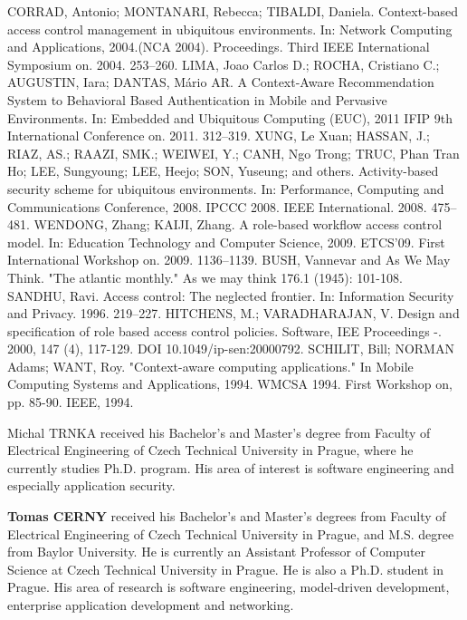 \documentclass{poster15}
\begin{document}
\begin{thebibliography}{9}
CORRAD, Antonio; MONTANARI, Rebecca; TIBALDI, Daniela. Context-based access control management in ubiquitous environments. In: Network Computing and Applications, 2004.(NCA 2004). Proceedings. Third IEEE International Symposium on. 2004. 253–260.
LIMA, Joao Carlos D.; ROCHA, Cristiano C.; AUGUSTIN, Iara; DANTAS, Mário AR. A Context-Aware Recommendation System to Behavioral Based Authentication in Mobile and Pervasive Environments. In: Embedded and Ubiquitous Computing (EUC), 2011 IFIP 9th International Conference on. 2011. 312–319.
XUNG, Le Xuan; HASSAN, J.; RIAZ, AS.; RAAZI, SMK.; WEIWEI, Y.; CANH, Ngo Trong; TRUC, Phan
Tran Ho; LEE, Sungyoung; LEE, Heejo; SON, Yuseung; and others. Activity-based security scheme for ubiquitous environments. In: Performance, Computing and Communications Conference, 2008. IPCCC 2008. IEEE International. 2008. 475–481.
WENDONG, Zhang; KAIJI, Zhang. A role-based workflow access control model. In: Education Technology and Computer Science, 2009. ETCS’09. First International Workshop on. 2009. 1136–1139.
BUSH, Vannevar and As We May Think. "The atlantic monthly." As we may think 176.1 (1945): 101-108.
SANDHU, Ravi. Access control: The neglected frontier. In: Information Security and Privacy. 1996. 219–227.
HITCHENS, M.; VARADHARAJAN, V. Design and specification of role based access control policies. Software, IEE Proceedings -. 2000, 147 (4), 117-129. DOI 10.1049/ip-sen:20000792.
SCHILIT, Bill; NORMAN Adams; WANT, Roy. "Context-aware computing applications." In Mobile Computing Systems and Applications, 1994. WMCSA 1994. First Workshop on, pp. 85-90. IEEE, 1994.
\end{thebibliography}

\begin{authorcv}{Michal TRNKA}
received his Bachelor's and Master's degree from Faculty of Electrical Engineering of Czech Technical University in Prague, where he currently studies Ph.D. program. His area of interest is software engineering and especially application security.

\textbf{Tomas CERNY} received his Bachelor's and Master's degrees from Faculty of Electrical Engineering of Czech Technical University in Prague, and M.S. degree from Baylor University. He is currently an Assistant Professor of Computer Science at Czech Technical University in Prague. He is also a Ph.D. student in Prague. His area of research is software engineering, model-driven development, enterprise application development and networking.
\end{authorcv}
\end{document}
